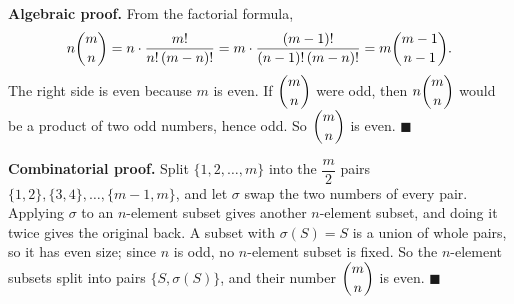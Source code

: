 \textbf{Algebraic proof.} From the factorial formula,
\[n\dbinom mn=n\cdot\dfrac{m!}{n!\,(m-n)!}=m\cdot\dfrac{(m-1)!}{(n-1)!\,(m-n)!}=m\dbinom{m-1}{n-1}.\]
The right side is even because $m$ is even. If $\dbinom mn$ were odd, then $n\dbinom mn$ would be a product of two odd numbers, hence odd. So $\dbinom mn$ is even. $\blacksquare$

\textbf{Combinatorial proof.} Split $\{1,2,\dots,m\}$ into the $\dfrac m2$ pairs $\{1,2\},\{3,4\},\dots,\{m-1,m\}$, and let $\sigma$ swap the two numbers of every pair. Applying $\sigma$ to an $n$-element subset gives another $n$-element subset, and doing it twice gives the original back. A subset with $\sigma(S)=S$ is a union of whole pairs, so it has even size; since $n$ is odd, no $n$-element subset is fixed. So the $n$-element subsets split into pairs $\{S,\sigma(S)\}$, and their number $\dbinom mn$ is even. $\blacksquare$

